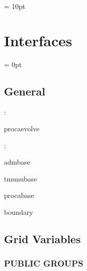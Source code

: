 \vspace{0.5cm}\parskip = 10pt 

\section{Interfaces} 


\parskip = 0pt

\vspace{3mm} \subsection*{General}

: 

procaevolve
\vspace{2mm}

: 

admbase

tmunubase

procabase

boundary
\vspace{2mm}
\subsection*{Grid Variables}
\vspace{5mm}\subsubsection{PUBLIC GROUPS}

\vspace{5mm}

